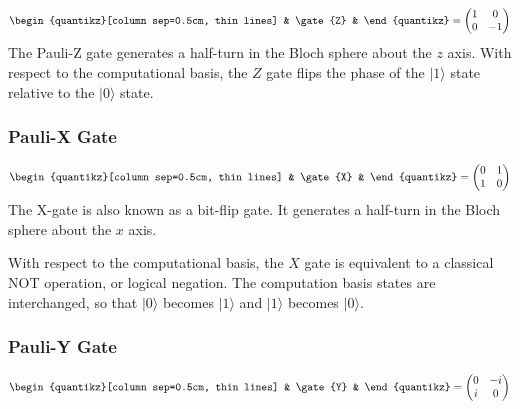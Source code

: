 \documentclass[10pt]{article}
\numberwithin{equation}{section}
\theoremstyle{defi}
\begin{document}
\begin{equation}
  \label{eq:16}
  \begin{quantikz}[column sep=0.5cm, thin lines]
    & \gate{Z} &
  \end{quantikz}
  = \begin{pmatrix}
    1 & 0\\ 
    0 & -1\\ 
    \end{pmatrix}
\end{equation}
The Pauli-Z gate generates a half-turn in the Bloch sphere about the $z$ axis. With respect to the computational basis, the $Z$ gate flips the phase of the $|1\rangle$ state relative to the $|0\rangle$ state.

\subsubsection{Pauli-X Gate}
\begin{equation}
  \label{eq:17}
  \begin{quantikz}[column sep=0.5cm, thin lines]
    & \gate{X} &
  \end{quantikz}
  = \begin{pmatrix}
    0 & 1\\ 
    1 & 0\\ 
    \end{pmatrix}
\end{equation}
The X-gate is also known as a bit-flip gate. It generates a half-turn in the Bloch sphere about the $x$ axis.

With respect to the computational basis, the $X$ gate is equivalent to a classical NOT operation, or logical negation. The computation basis states are interchanged, so that $|0\rangle$ becomes $|1\rangle$ and $|1\rangle$ becomes $|0\rangle$. 

\subsubsection{Pauli-Y Gate}

\begin{equation}
  \label{eq:18}
  \begin{quantikz}[column sep=0.5cm, thin lines]
    & \gate{Y} &
  \end{quantikz}
  = \begin{pmatrix}
    0 & -i\\ 
    i & 0\\ 
    \end{pmatrix}
\end{equation}
\end{document}
